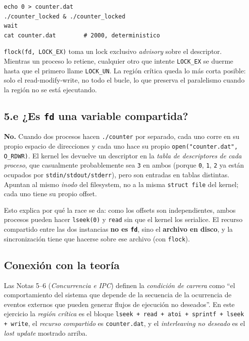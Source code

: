 \documentclass[11pt,a4paper]{article}
\begin{document}
\begin{lstlisting}
echo 0 > counter.dat
./counter_locked & ./counter_locked
wait
cat counter.dat        # 2000, deterministico
\end{lstlisting}

\texttt{flock(fd, LOCK\_EX)} toma un lock exclusivo \emph{advisory} sobre
el descriptor. Mientras un proceso lo retiene, cualquier otro que intente
\texttt{LOCK\_EX} se duerme hasta que el primero llame \texttt{LOCK\_UN}.
La región crítica queda lo más corta posible: solo el read-modify-write,
no todo el bucle, lo que preserva el paralelismo cuando la región no se
está ejecutando.

\subsection*{5.e ¿Es \texttt{fd} una variable compartida?}

\textbf{No.} Cuando dos procesos hacen \texttt{./counter} por separado,
cada uno corre en su propio espacio de direcciones y cada uno hace su
propio \texttt{open("counter.dat", O\_RDWR)}. El kernel les devuelve un
descriptor en la \emph{tabla de descriptores} \emph{de cada proceso},
que casualmente probablemente sea \texttt{3} en ambos (porque
\texttt{0}, \texttt{1}, \texttt{2} ya están ocupados por
\texttt{stdin/stdout/stderr}), pero son entradas en tablas distintas.
Apuntan al mismo \emph{inodo} del filesystem, no a la misma
\texttt{struct file} del kernel; cada uno tiene su propio offset.

Esto explica por qué la race se da: como los offsets son independientes,
ambos procesos pueden hacer \texttt{lseek(0)} y \texttt{read} sin que el
kernel los serialice. El recurso compartido entre las dos instancias
\textbf{no es \texttt{fd}}, sino el \textbf{archivo en disco}, y la
sincronización tiene que hacerse sobre ese archivo (con \texttt{flock}).

\subsection*{Conexión con la teoría}

Las Notas 5--6 (\emph{Concurrencia e IPC}) definen la \emph{condición
de carrera} como ``el comportamiento del sistema que depende de la
secuencia de la ocurrencia de eventos externos que pueden generar flujos
de ejecución no deseados''. En este ejercicio la \emph{región crítica}
es el bloque \texttt{lseek + read + atoi + sprintf + lseek + write}, el
\emph{recurso compartido} es \texttt{counter.dat}, y el \emph{interleaving
no deseado} es el \emph{lost update} mostrado arriba.
\end{document}
